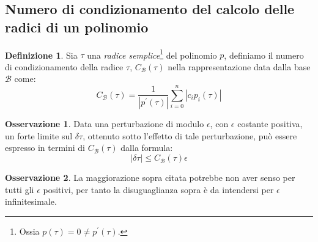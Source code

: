 \documentclass[a4paper,12pt]{report}
\theoremstyle{definition}
\newtheorem{defin}{Definizione}[chapter]
\newtheorem{oss}{Osservazione}[chapter]
\begin{document}
\subsection{Numero di condizionamento del calcolo delle radici di un polinomio}

\begin{defin}
	Sia $\tau$ una \textit{radice semplice}\footnote{Ossia $p(\tau) = 0 \not= p^\prime(\tau)$.} del polinomio $p$,
	definiamo il numero di condizionamento della radice $\tau$, $C_{\mathcal{B}}(\tau)$ nella rappresentazione data dalla base $\mathcal{B}$ come:
	$$C_{\mathcal{B}}(\tau) = \frac{1}{\left| p^\prime(\tau)\right|}\sum_{i=0}^{n} \left| c_ip_i(\tau)\right|$$
\end{defin}
\begin{oss}
	Data una perturbazione di modulo $\epsilon$, con $\epsilon$ costante positiva,
	un forte limite sul $\delta\tau$, ottenuto sotto l'effetto di tale perturbazione, può essere espresso in termini di $C_{\mathcal{B}}(\tau)$ dalla formula:$$\left| \delta\tau \right| \leq C_{\mathcal{B}}(\tau)\epsilon $$
\end{oss}
\begin{oss}
	La maggiorazione sopra citata potrebbe non aver senso per tutti gli $\epsilon$ positivi, per tanto la disuguaglianza sopra è da intendersi per $\epsilon$ infinitesimale.
\end{oss}
\end{document}
